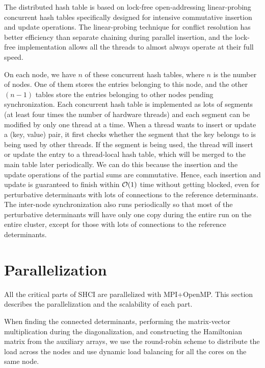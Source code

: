 \documentclass[%
preprint,
 superscriptaddress,
 amsmath,amssymb,
 aps,
]{revtex4-1}
\begin{document}
The distributed hash table is based on lock-free open-addressing linear-probing concurrent hash tables specifically designed
for intensive commutative insertion and update operations.
The linear-probing technique for conflict resolution has better efficiency than separate chaining during parallel insertion,
and the lock-free implementation allows all the threads to almost always operate at their full speed.

On each node, we have $n$ of these concurrent hash tables, where $n$ is the number of nodes.
One of them stores the entries belonging to this node, and the other $(n-1)$ tables store the entries belonging to other nodes pending synchronization.
Each concurrent hash table is implemented as lots of segments (at least four times the number of hardware threads) and each segment can be modified by only one thread at a time.
When a thread wants to insert or update a (key, value) pair, it first checks whether the segment that the key belongs to is being used by other threads.
If the segment is being used, the thread will insert or update the entry to a thread-local hash table, which will be merged to the main table later periodically.
We can do this because the insertion and the update operations of the partial sums are commutative.
Hence, each insertion and update is guaranteed to finish within ${\cal O}(1)$ time without getting blocked, even for perturbative determinants with lots of connections to the reference determinants.
The inter-node synchronization also runs periodically so that most of the perturbative determinants will have only one copy during the entire run on the entire cluster, except for those with lots of connections to the reference determinants.

\section{Parallelization}
\label{para}

All the critical parts of SHCI are parallelized with MPI+OpenMP.
This section describes the parallelization and the scalability of each part.

When finding the connected determinants, performing the matrix-vector multiplication during the diagonalization,
and constructing the Hamiltonian matrix from the auxiliary arrays, we use the round-robin scheme to distribute the load across the nodes
and use dynamic load balancing for all the cores on the same node.
\end{document}
